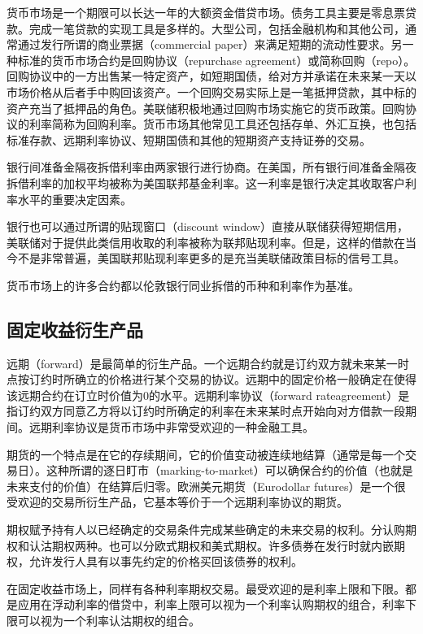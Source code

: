 \documentclass[UTF8]{ctexart}
\begin{document}
货币市场是一个期限可以长达一年的大额资金借贷市场。债务工具主要是零息票贷款。完成一笔贷款的实现工具是多样的。大型公司，包括金融机构和其他公司，通常通过发行所谓的商业票据（commercial paper）来满足短期的流动性要求。另一种标准的货币市场合约是回购协议（repurchase agreement）或简称回购（repo）。回购协议中的一方出售某一特定资产，如短期国债，给对方并承诺在未来某一天以市场价格从后者手中购回该资产。一个回购交易实际上是一笔抵押贷款，其中标的资产充当了抵押品的角色。美联储积极地通过回购市场实施它的货币政策。回购协议的利率简称为回购利率。货币市场其他常见工具还包括存单、外汇互换，也包括标准存款、远期利率协议、短期国债和其他的短期资产支持证券的交易。

银行间准备金隔夜拆借利率由两家银行进行协商。在美国，所有银行间准备金隔夜拆借利率的加权平均被称为美国联邦基金利率。这一利率是银行决定其收取客户利率水平的重要决定因素。

银行也可以通过所谓的贴现窗口（discount window）直接从联储获得短期信用，美联储对于提供此类信用收取的利率被称为联邦贴现利率。但是，这样的借款在当今不是非常普遍，美国联邦贴现利率更多的是充当美联储政策目标的信号工具。

货币市场上的许多合约都以伦敦银行同业拆借的币种和利率作为基准。

\subsection{固定收益衍生产品}

远期（forward）是最简单的衍生产品。一个远期合约就是订约双方就未来某一时点按订约时所确立的价格进行某个交易的协议。远期中的固定价格一般确定在使得该远期合约在订立时价值为0的水平。远期利率协议（forward rateagreement）是指订约双方同意乙方将以订约时所确定的利率在未来某时点开始向对方借款一段期间。远期利率协议是货币市场中非常受欢迎的一种金融工具。

期货的一个特点是在它的存续期间，它的价值变动被连续地结算（通常是每一个交易日）。这种所谓的逐日盯市（marking-to-market）可以确保合约的价值（也就是未来支付的价值）在结算后归零。欧洲美元期货（Eurodollar futures）是一个很受欢迎的交易所衍生产品，它基本等价于一个远期利率协议的期货。

期权赋予持有人以已经确定的交易条件完成某些确定的未来交易的权利。分认购期权和认沽期权两种。也可以分欧式期权和美式期权。许多债券在发行时就内嵌期权，允许发行人具有以事先约定的价格买回该债券的权利。

在固定收益市场上，同样有各种利率期权交易。最受欢迎的是利率上限和下限。都是应用在浮动利率的借贷中，利率上限可以视为一个利率认购期权的组合，利率下限可以视为一个利率认沽期权的组合。
\end{document}
